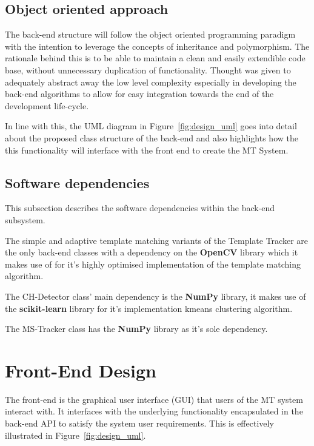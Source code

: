 \subsection{Object oriented approach}
The back-end structure will follow the object oriented programming paradigm with
the intention to leverage the concepts of inheritance and polymorphism. The
rationale behind this is to be able to maintain a clean and easily extendible
code base, without unnecessary duplication of functionality. Thought was given
to adequately abstract away the low level complexity especially in developing
the back-end algorithms to allow for easy integration towards the end of the
development life-cycle. 

In line with this, the UML diagram in Figure~\ref{fig:design_uml} goes into
detail about the proposed class structure of the back-end and also highlights how the 
this functionality will interface with the front end to create the MT System.


\subsection{Software dependencies}
This subsection describes the software dependencies within the back-end
subsystem.

The simple and adaptive template matching variants of the Template Tracker are
the only back-end classes with a dependency on the \textbf{OpenCV} library which
it makes use of for it's highly optimised implementation of the
template matching algorithm.

The CH-Detector class' main dependency is the \textbf{NumPy} library, it makes
use of the \textbf{scikit-learn} library for it's implementation kmeans clustering
algorithm.

The MS-Tracker class has the \textbf{NumPy} library as it's sole dependency.

\section{Front-End Design}
The front-end is the graphical user interface (GUI) that users of the MT
system interact with. 
It interfaces with the underlying functionality encapsulated in the back-end API to
satisfy the system user requirements. This is effectively illustrated in
Figure~\ref{fig:design_uml}. 


